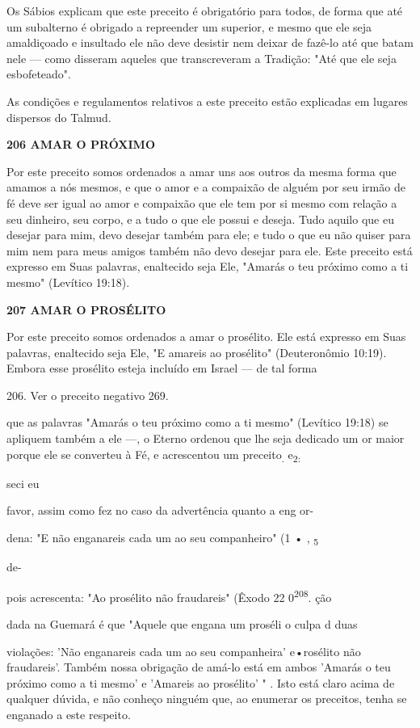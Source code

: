 \begin{itemize}
\begin{enumrate}
\begin{itemize}
\begin{itemize}
\begin{itemize}
Os Sábios explicam que este preceito é obrigatório para todos, de forma
que até um subalterno é obrigado a repreender um superior, e mesmo que
ele seja amaldiçoado e insultado ele não deve desistir nem deixar de
fazê-lo até que batam nele --- como disseram aqueles que transcreveram a
Tradição: "Até que ele seja esbofeteado".

As condições e regulamentos relativos a este preceito estão explica­das
em lugares dispersos do Talmud.

\textbf{206 AMAR O PRÓXIMO}

Por este preceito somos ordenados a amar uns aos outros da mesma forma
que amamos a nós mesmos, e que o amor e a compaixão de alguém por seu
irmão de fé deve ser igual ao amor e compaixão que ele tem por si mesmo
com relação a seu dinheiro, seu corpo, e a tudo o que ele possui e
deseja. Tudo aquilo que eu desejar para mim, devo desejar também para
ele; e tudo o que eu não quiser para mim nem para meus amigos também não
devo desejar para ele. Este preceito está expresso em Suas palavras,
enaltecido seja Ele, "Amarás o teu próximo como a ti mesmo" (Levítico
19:18).

\textbf{207 AMAR O PROSÉLITO}

Por este preceito somos ordenados a amar o prosélito. Ele está ex­presso
em Suas palavras, enaltecido seja Ele, "E amareis ao prosélito"
(Deute­ronômio 10:19). Embora esse prosélito esteja incluído em Israel
--- de tal forma

206. Ver o preceito negativo 269.

que as palavras "Amarás o teu próximo como a ti mesmo" (Levítico 19:18)
se apliquem também a ele ---, o Eterno ordenou que lhe seja dedicado um
or maior porque ele se converteu à Fé, e acrescentou um
preceito\textsubscript{.} e\textsubscript{2:}

seci eu

favor, assim como fez no caso da advertência quanto a eng or-

dena: "E não enganareis cada um ao seu companheiro" (1 • ,
\textsubscript{5}


de-


pois acrescenta: "Ao prosélito não fraudareis" (Êxodo 22
0\textsuperscript{208}. ção

dada na Guemará é que "Aquele que engana um proséli o culpa d duas

violações: 'Não enganareis cada um ao seu companheira' e•rosélito não
fraudareis'. Também nossa obrigação de amá-lo está em ambos 'Amarás o
teu próximo como a ti mesmo' e 'Amareis ao prosélito' " . Isto está
claro acima de qualquer dúvida, e não conheço ninguém que, ao enumerar
os preceitos, te­nha se enganado a este respeito.


\end{itemize}
\end{itemize}
\end{itemize}
\end{enumrate}
\end{itemize}
